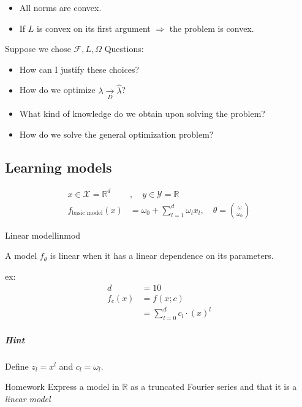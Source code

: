 \begin{itemize}
	\item All norms are convex.
	\item If $L$ is convex on its first argument $\Rightarrow$ the problem is convex.
\end{itemize}

Suppose we chose $\mathcal{F}, L, \Omega$ Questions:

\begin{itemize}
	\item How can I justify these choices?
	\item How do we optimize $\lambda \xrightarrow[D]{} \hat\lambda$?
	\item What kind of knowledge do we obtain upon solving the problem?
	\item How do we solve the general optimization problem?
\end{itemize}

\subsection{Learning models} %

\begin{align*}
	x \in \mathcal{X} = \mathds{R}^d & , \quad y \in \mathcal{Y} = \mathds{R}                                            \\
	f_{\text{basic model}}(x)        & = \omega_0 + \sum_{l = 1}^d \omega_l x_l, \quad \theta = \binom{\omega}{\omega_0}
\end{align*}

\begin{definition}{Linear model}{linmod}

A model $f_\theta$ is linear when it has a linear dependence on its parameters.

ex:
\begin{align*}
	d      & = 10                           \\
	f_c(x) & = f(x;c)                       \\
	       & = \sum_{l=0}^d c_l \cdot (x)^l
\end{align*}
\end{definition}

\subparagraph{Hint} Define $z_l = x^l$ and $c_l = \omega_l$.

\begin{exercise}{Homework}{}
Express a model in $\mathds{R}$ as a truncated Fourier series and
that it is a \emph{linear model}
\end{exercise}

